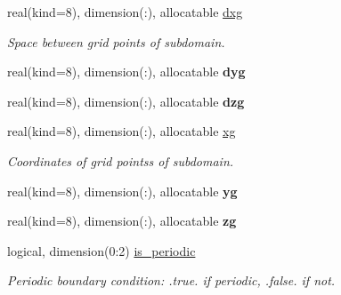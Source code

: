 \textbf{ }\par
\begin{DoxyCompactItemize}
\item 
\mbox{\label{structgeometry_1_1subdomain_a1f1a198a8a9dcf0a2cc571897a4bc0cb}} 
real(kind=8), dimension(\+:), allocatable \hyperlink{structgeometry_1_1subdomain_a1f1a198a8a9dcf0a2cc571897a4bc0cb}{dxg}
\begin{DoxyCompactList}\small\item\em Space between grid points of subdomain. \end{DoxyCompactList}\item 
\mbox{\label{structgeometry_1_1subdomain_ad4dfb84d28757bc3c3b9fdd07c8bd373}} 
real(kind=8), dimension(\+:), allocatable {\bfseries dyg}
\item 
\mbox{\label{structgeometry_1_1subdomain_a6ab718cebcef3accb469924bc5d5d3c7}} 
real(kind=8), dimension(\+:), allocatable {\bfseries dzg}
\end{DoxyCompactItemize}

\textbf{ }\par
\begin{DoxyCompactItemize}
\item 
\mbox{\label{structgeometry_1_1subdomain_aca30707e5150e7168bd8bc1371970364}} 
real(kind=8), dimension(\+:), allocatable \hyperlink{structgeometry_1_1subdomain_aca30707e5150e7168bd8bc1371970364}{xg}
\begin{DoxyCompactList}\small\item\em Coordinates of grid pointss of subdomain. \end{DoxyCompactList}\item 
\mbox{\label{structgeometry_1_1subdomain_a078bcb84698ead561ca0546ba9a2e158}} 
real(kind=8), dimension(\+:), allocatable {\bfseries yg}
\item 
\mbox{\label{structgeometry_1_1subdomain_afdb6b7b2dc6bfc6587a1af1c6ac3a2f0}} 
real(kind=8), dimension(\+:), allocatable {\bfseries zg}
\end{DoxyCompactItemize}

\textbf{ }\par
\begin{DoxyCompactItemize}
\item 
\mbox{\label{structgeometry_1_1subdomain_a0f3a1589b2d2a7432226f2e6f3f34045}} 
logical, dimension(0\+:2) \hyperlink{structgeometry_1_1subdomain_a0f3a1589b2d2a7432226f2e6f3f34045}{is\+\_\+periodic}
\begin{DoxyCompactList}\small\item\em Periodic boundary condition\+: .true. if periodic, .false. if not. \end{DoxyCompactList}\end{DoxyCompactItemize}

